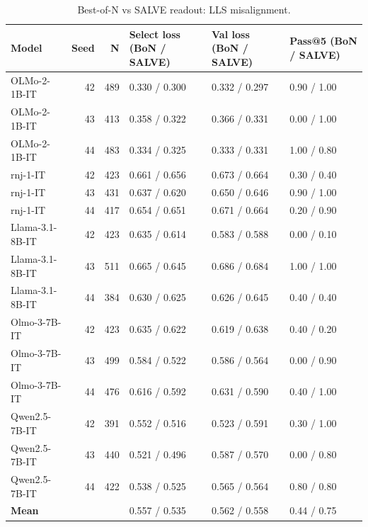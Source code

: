 \begin{table}[h]
\centering
\small
\begin{tabular}{lrrlll}
\toprule
Model & Seed & N & Select loss (BoN / SALVE) & Val loss (BoN / SALVE) & Pass@5 (BoN / SALVE) \\
\midrule
OLMo-2-1B-IT & 42 & 489 & 0.330 / 0.300 & 0.332 / 0.297 & 0.90 / 1.00 \\
OLMo-2-1B-IT & 43 & 413 & 0.358 / 0.322 & 0.366 / 0.331 & 0.00 / 1.00 \\
OLMo-2-1B-IT & 44 & 483 & 0.334 / 0.325 & 0.333 / 0.331 & 1.00 / 0.80 \\
rnj-1-IT & 42 & 423 & 0.661 / 0.656 & 0.673 / 0.664 & 0.30 / 0.40 \\
rnj-1-IT & 43 & 431 & 0.637 / 0.620 & 0.650 / 0.646 & 0.90 / 1.00 \\
rnj-1-IT & 44 & 417 & 0.654 / 0.651 & 0.671 / 0.664 & 0.20 / 0.90 \\
Llama-3.1-8B-IT & 42 & 423 & 0.635 / 0.614 & 0.583 / 0.588 & 0.00 / 0.10 \\
Llama-3.1-8B-IT & 43 & 511 & 0.665 / 0.645 & 0.686 / 0.684 & 1.00 / 1.00 \\
Llama-3.1-8B-IT & 44 & 384 & 0.630 / 0.625 & 0.626 / 0.645 & 0.40 / 0.40 \\
Olmo-3-7B-IT & 42 & 423 & 0.635 / 0.622 & 0.619 / 0.638 & 0.40 / 0.20 \\
Olmo-3-7B-IT & 43 & 499 & 0.584 / 0.522 & 0.586 / 0.564 & 0.00 / 0.90 \\
Olmo-3-7B-IT & 44 & 476 & 0.616 / 0.592 & 0.631 / 0.590 & 0.40 / 1.00 \\
Qwen2.5-7B-IT & 42 & 391 & 0.552 / 0.516 & 0.523 / 0.591 & 0.30 / 1.00 \\
Qwen2.5-7B-IT & 43 & 440 & 0.521 / 0.496 & 0.587 / 0.570 & 0.00 / 0.80 \\
Qwen2.5-7B-IT & 44 & 422 & 0.538 / 0.525 & 0.565 / 0.564 & 0.80 / 0.80 \\
\midrule
\textbf{Mean} &  &  & 0.557 / 0.535 & 0.562 / 0.558 & 0.44 / 0.75 \\
\bottomrule
\end{tabular}
\caption{Best-of-N vs SALVE readout: LLS misalignment.}
\label{tab:bon_lls_misalignment}
\end{table}

